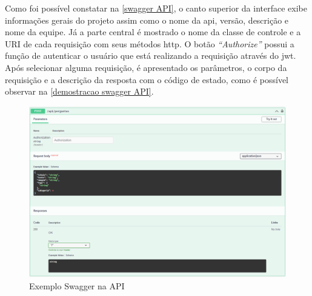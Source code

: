 Como foi possível constatar na \autoref{swagger API}, o canto superior da interface exibe informações gerais do projeto assim como o nome da \acs{api}, versão, descrição e nome da equipe. Já a parte central é mostrado o nome da classe de controle e a URI de cada requisição com seus métodos \acs{http}. O botão \textit{``Authorize''} possui a função de autenticar o usuário que está realizando a requisição através do \acs{jwt}. Após selecionar alguma requisição, é apresentado os parâmetros, o corpo da requisição e a descrição da resposta com o código de estado, como é possível observar na \autoref{demostracao swagger API}.

\begin{figure}[htb]
\centering
\caption{\label{demostracao swagger API} Exemplo Swagger na API}
\includegraphics[width=1\textwidth]{anexos/Imagens_Swagger/API_swagger_demostracao.png}
\end{figure}
\FloatBarrier
